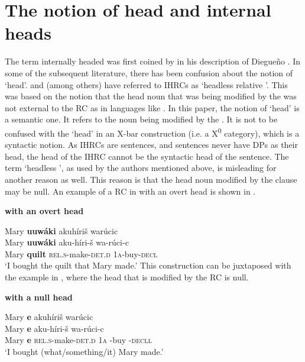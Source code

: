 \documentclass[output=paper]{LSP/langsci}
\begin{document}
\section{The notion of head and internal heads}\label{sec:boyle:3}

The term internally headed  was first coined by \citet{Gorbet1976} in his description of Diegue\~no .  In some of the subsequent literature, there has been confusion about the notion of `head'. \citet{Coleetal1982} and \citet{Weber1983} (among others) have referred to IHRCs as `headless relative '. This was based on the notion that the head noun that was being modified by the  was not external to the RC as in languages like . In this paper, the notion of `head' is a semantic one. It refers to the noun being modified by the . It is not to be confused with the `head' in an X-bar construction (i.e. a X\textsuperscript{0} category), which is a syntactic notion. As IHRCs are sentences, and sentences never have DPs as their head, the head of the IHRC cannot be the syntactic head of the sentence.  The term `headless ', as used by the authors mentioned above, is misleading for another reason as well.  This reason is that the head noun modified by the clause may be null.  An example of a RC in  with an overt head is shown in .

\ea \textbf{  with an overt head} \label{boyle9}

\glll Mary \textbf{uuw\'aki} akuh\'iri\v{s} war\'ucic\\
Mary \textbf{uuw\'aki} aku-h\'iri-\v{s}      wa-r\'uci-c\\
Mary \textbf{quilt} \textsc{rel.s}-make-\textsc{det.d} \textsc{1a}-buy-\textsc{decl} \\
\trans `I bought the quilt that Mary made.' 	
\z
This construction can be juxtaposed with the example in , where the head that is modified by the RC is null.

\ea \textbf{  with a null head} \label{boyle10}

\glll Mary \textbf{e} akuh\'iri\v{s} war\'ucic\\
Mary \textbf{e} aku-h\'iri-\v{s}   wa-r\'uci-c\\
Mary \textbf{e} \textsc{rel.s}-make-\textsc{det.d} \textsc{1a} -buy -\textsc{decll}\\ 
\trans `I bought (what/something/it) Mary made.'
\z
\end{document}
